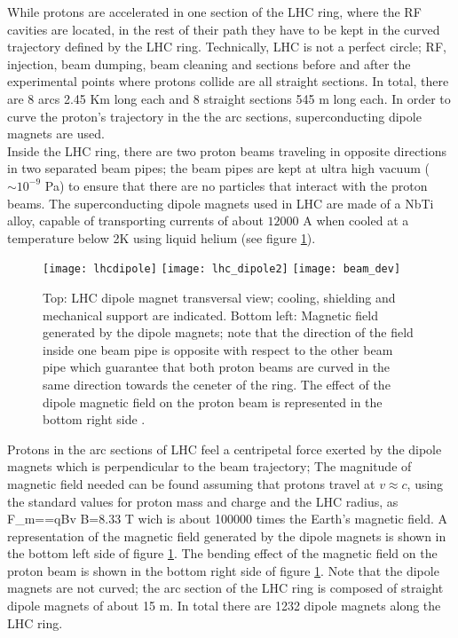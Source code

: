 \noindent While protons are accelerated in one section of the LHC ring, where the RF cavities are located, in the rest of their path they have to be kept in the curved trajectory defined by the LHC ring. Technically, LHC is not a perfect circle; RF, injection, beam dumping, beam cleaning and sections before and after the experimental points where protons collide are all straight sections. In total, there are 8 arcs 2.45 Km long each and 8 straight sections 545 m long each. In order to curve the proton's trajectory in the the arc sections, superconducting dipole magnets are used.\\               

\noindent Inside the LHC ring, there are two proton beams traveling in opposite directions in two separated beam pipes; the beam pipes are kept at ultra high vacuum ($\sim 10^{-9}$ Pa) to ensure that there are no particles that interact with the proton beams. The superconducting dipole magnets used in LHC are made of a NbTi alloy, capable of transporting currents of about $12000$ A when cooled at a temperature below 2K using liquid helium (see figure \ref{fig:lhcdipole}).

\begin{figure}[!h]
\centering
\texttt{[image: lhcdipole]}
\texttt{[image: lhc\_dipole2]}
\texttt{[image: beam\_dev]}
\caption [LHC dipole magnet.]{Top: LHC dipole magnet transversal view; cooling, shielding and mechanical support are indicated. Bottom left: Magnetic field generated by the dipole magnets; note that the direction of the field inside one beam pipe is opposite with respect to the other beam pipe which guarantee that both proton beams are curved in the same direction towards the ceneter of the ring. The effect of the dipole magnetic field on the proton beam is represented in the bottom right side \cite{lhc_dipole, dipole_field,video}.}\label{fig:lhcdipole}
\end{figure}

\noindent Protons in the arc sections of LHC feel a centripetal force exerted by the dipole magnets which is perpendicular to the beam trajectory; The magnitude of magnetic field needed can be found assuming that protons travel at $v \approx c$, using the standard values for proton mass and charge and the LHC radius, as
\beqn
F_m==qBv \quad \to B=8.33 T
\eeqn
\noindent wich is about 100000 times the Earth's magnetic field. A representation of the magnetic field generated by the dipole magnets is shown in the bottom left side of figure \ref{fig:lhcdipole}. The bending effect of the magnetic field on the proton beam is shown in the bottom right side of figure \ref{fig:lhcdipole}. Note that the dipole magnets are not curved; the arc section of the LHC ring is composed of straight dipole magnets of about 15 m. In total there are 1232 dipole magnets along the LHC ring.

